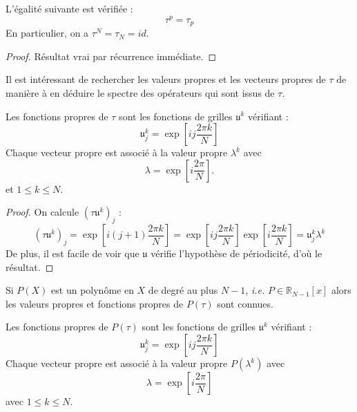 \begin{proposition}
L'égalité suivante est vérifiée :
\begin{equation}
\tau^p = \tau_p
\end{equation}
En particulier, on a $\tau^N = \tau_N = id$.
\end{proposition}

\begin{proof}
Résultat vrai par récurrence immédiate.
\end{proof}
Il est intéressant de rechercher les valeurs propres et les vecteurs propres de $\tau$ de manière à en déduire le spectre des opérateurs qui sont issus de $\tau$.


\begin{proposition}
Les fonctions propres de $\tau$ sont les fonctions de grilles $\mathfrak{u}^k$ vérifiant :
\begin{equation}
\mathfrak{u}_j^k = \exp \left[ i j \dfrac{2 \pi k}{N} \right]
\label{eq:vecteurpropre_tau}
\end{equation}
Chaque vecteur propre est associé à la valeur propre $\lambda^k$ avec 
\begin{equation}
\lambda = \exp \left[ i \dfrac{2 \pi}{N} \right].
\end{equation}
et $1 \leq k \leq N$.
\end{proposition}


\begin{proof}
On calcule $(\tau \mathfrak{u}^k)_j$ :
\begin{equation}
(\tau \mathfrak{u}^k)_j = \exp \left[ i (j+1) \dfrac{2 \pi k}{N} \right] = \exp \left[ i j \dfrac{2 \pi k}{N} \right] \exp \left[ i \dfrac{2 \pi k}{N} \right]  = \mathfrak{u}_j^k \lambda^k
\end{equation}
De plus, il est facile de voir que $\mathfrak{u}$ vérifie l'hypothèse de périodicité, d'où le résultat.
\end{proof}
Si $P(X)$ est un polynôme en $X$ de degré au plus $N-1$, \textit{i.e.} $P \in \mathbb{R}_{N-1} [x]$ alors les valeurs propres et fonctions propres de $P(\tau)$ sont connues.

\begin{proposition}
Les fonctions propres de $P(\tau)$ sont les fonctions de grilles $\mathfrak{u}^k$ vérifiant :
\begin{equation}
\mathfrak{u}_j^k = \exp \left[ i j \dfrac{2 \pi k}{N} \right]
\end{equation}
Chaque vecteur propre est associé à la valeur propre $P(\lambda^k)$ avec 
\begin{equation}
\lambda = \exp \left[ i \dfrac{2 \pi}{N} \right]
\end{equation}
avec $1 \leq k \leq N$.
\label{prop:eigen_tau}
\end{proposition}

